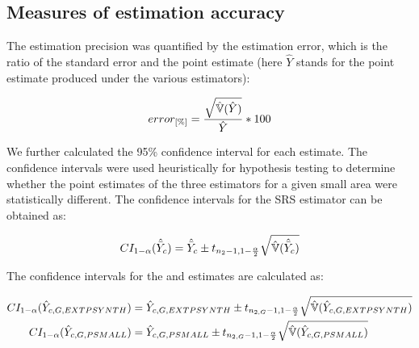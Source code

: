 \subsection{Measures of estimation accuracy}

The estimation precision was quantified by the estimation error, which is the ratio of the standard error and the point estimate (here $\hat{Y}$ stands for the point estimate produced under the various estimators):

\begin{equation}\label{eq:error}
error_{[\%]}=\frac{\sqrt{\hat{\mathbb{V}}(\hat{Y})}}{\hat{Y}}*100
\end{equation}

We further calculated the 95\% confidence interval for each estimate. The confidence intervals were used heuristically for hypothesis testing to determine whether the point estimates of the three estimators for a given small area were statistically different. The confidence intervals for the SRS estimator can be obtained as:


\begin{equation}\label{ci_1phase}
CI_{1-\alpha}(\hat{\bar{Y}}_c)=\hat{\bar{Y}}_c \pm t_{n_{2}-1, 1-\frac{\alpha}{2}}\sqrt{\hat{\mathbb{V}}(\hat{\bar{Y}}_c)}
\end{equation}


The confidence intervals for the \psmall{} and \extpsynth{} estimates are calculated as:


\begin{subequations}\label{ci_2phase_sae}
	\begin{align}
	CI_{1-\alpha}(\hat{Y}_{c,G,EXTPSYNTH})&=\hat{Y}_{c,G,EXTPSYNTH} \pm t_{n_{2,G}-1, 1-\frac{\alpha}{2}}\sqrt{\hat{\mathbb{V}}(\hat{Y}_{c,G,EXTPSYNTH})} \\
	CI_{1-\alpha}(\hat{Y}_{c,G,PSMALL})&=\hat{Y}_{c,G,PSMALL} \pm t_{n_{2,G}-1, 1-\frac{\alpha}{2}}\sqrt{\hat{\mathbb{V}}(\hat{Y}_{c,G,PSMALL})}
	\end{align}
\end{subequations}



